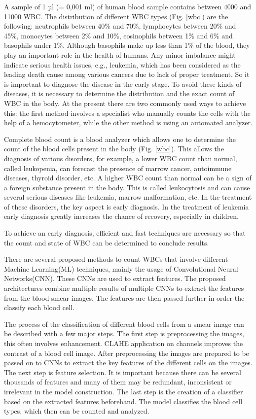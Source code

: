 A sample of 1 µl (= 0,001 ml) of human blood sample contains between 4000 and 11000 WBC. The distribution of different WBC types (Fig. \ref{wbc}) are the following: neutrophils between 40\% and 70\%, lymphocytes between 20\% and 45\%, monocytes between 2\% and 10\%, eosinophils between 1\% and 6\% and basophils under 1\%. Although basophils make up less than 1\% of the blood, they play an important role in the health of humans. Any minor imbalance might indicate serious health issues, e.g., leukemia,
\cite{AcuteLymphocyticLeukemia}
which has been considered as the leading death cause among various cancers due to lack of proper treatment. So it is important to diagnose the disease in the early stage. To avoid these kinds of diseases, it is necessary to determine the distribution and the exact count of WBC in the body. At the present there are two commonly used ways to achieve this: the first method involves a specialist who manually counts the cells with the help of a hemocytometer, while the other method is using an automated analyzer.
\cite{HemocytometerCounting}


Complete blood count
\cite{CBC}
is a blood analyzer which allows one to determine the count of the blood cells present in the body (Fig. \ref{wbc}). This allows the diagnosis of various disorders, for example, a lower WBC count than normal, called leukopenia, can forecast the presence of marrow cancer, autoimmune diseases, thyroid disorder, etc. A higher WBC count than normal can be a sign of a foreign substance present in the body. This is called leukocytosis and can cause several serious diseases like leukemia, marrow malformation, etc. In the treatment of these disorders, the key aspect is early diagnosis. In the treatment of leukemia early diagnosis greatly increases the chance of recovery, especially in children.



To achieve an early diagnosis, efficient and fast techniques are necessary so that the count and state of WBC can be determined to conclude results. 

There are several proposed methods to count WBCs that involve different Machine Learning(ML) techniques, mainly the usage of Convolutional Neural Networks(CNN). These CNNs are used to extract features. The proposed architectures combine multiple results of multiple CNNs to extract the features from the blood smear images. The features are then passed further in order the classify each blood cell.

The process of the classification of different blood cells from a smear image can be described with a few major steps. The first step is preprocessing the images, this often involves enhancement. CLAHE
\cite{CLAHE}
application on channels improves the contrast of a blood cell image. After preprocessing the images are prepared to be passed on to CNNs to extract the key features of the different cells on the images. The next step is feature selection. It is important because there can be several thousands of features and many of them may be redundant, inconsistent or irrelevant in the model construction. The last step is the creation of a classifier based on the extracted features beforehand. The model classifies the blood cell types, which then can be counted and analyzed.

